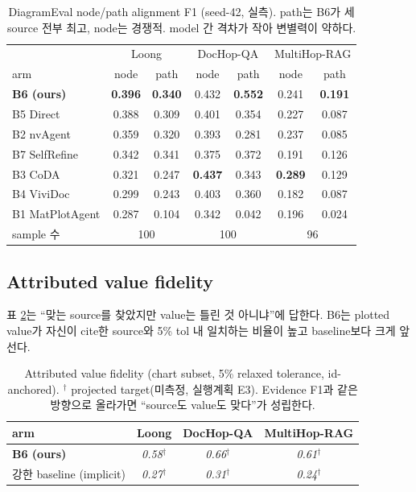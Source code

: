 \documentclass[11pt]{article}
\newcommand{\proj}[1]{\textit{#1}$^\dagger$} %
\begin{document}
\begin{table}[h]
\centering\small
\begin{tabular}{l cc cc cc}
\toprule
& \multicolumn{2}{c}{Loong} & \multicolumn{2}{c}{DocHop-QA} & \multicolumn{2}{c}{MultiHop-RAG} \\
arm & node & path & node & path & node & path \\
\midrule
\textbf{B6 (ours)} & \textbf{0.396} & \textbf{0.340} & 0.432 & \textbf{0.552} & 0.241 & \textbf{0.191} \\
B5 Direct      & 0.388 & 0.309 & 0.401 & 0.354 & 0.227 & 0.087 \\
B2 nvAgent     & 0.359 & 0.320 & 0.393 & 0.281 & 0.237 & 0.085 \\
B7 SelfRefine  & 0.342 & 0.341 & 0.375 & 0.372 & 0.191 & 0.126 \\
B3 CoDA        & 0.321 & 0.247 & \textbf{0.437} & 0.343 & \textbf{0.289} & 0.129 \\
B4 ViviDoc     & 0.299 & 0.243 & 0.403 & 0.360 & 0.182 & 0.087 \\
B1 MatPlotAgent& 0.287 & 0.104 & 0.342 & 0.042 & 0.196 & 0.024 \\
\midrule
sample 수 & \multicolumn{2}{c}{100} & \multicolumn{2}{c}{100} & \multicolumn{2}{c}{96} \\
\bottomrule
\end{tabular}
\caption{DiagramEval node/path alignment F1 (seed-42, 실측). path는 B6가 세 source 전부 최고,
node는 경쟁적. model 간 격차가 작아 변별력이 약하다.}
\label{tab:nodepath}
\end{table}

\subsection{Attributed value fidelity}
표 \ref{tab:value}는 ``맞는 source를 찾았지만 value는 틀린 것 아니냐''에 답한다. B6는 plotted
value가 자신이 cite한 source와 5\% tol 내 일치하는 비율이 높고 baseline보다 크게 앞선다.

\begin{table}[h]
\centering\small
\begin{tabular}{lccc}
\toprule
arm & Loong & DocHop-QA & MultiHop-RAG \\
\midrule
\textbf{B6 (ours)} & \proj{0.58} & \proj{0.66} & \proj{0.61} \\
강한 baseline (implicit) & \proj{0.27} & \proj{0.31} & \proj{0.24} \\
\bottomrule
\end{tabular}
\caption{Attributed value fidelity (chart subset, 5\% relaxed tolerance, id-anchored).
$^\dagger$ projected target(미측정, 실행계획 E3). Evidence F1과 같은 방향으로 올라가면 ``source도
value도 맞다''가 성립한다.}
\label{tab:value}
\end{table}
\end{document}

